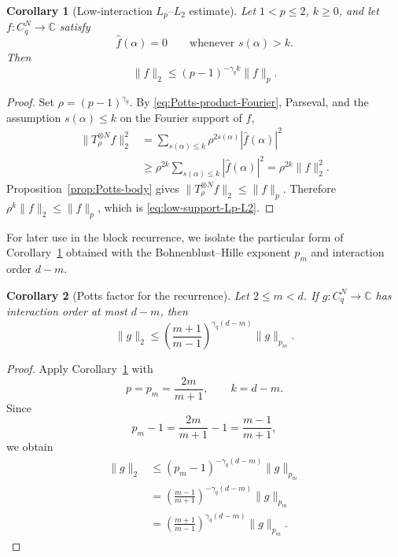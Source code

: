 \documentclass[11pt,a4paper]{article}
\numberwithin{equation}{section}
\theoremstyle{cleanplain}
\newtheorem{corollary}[corollary]{Corollary}
\theoremstyle{cleandefinition}
\theoremstyle{cleanremark}
\newcommand{\C}{\mathbb C}
\begin{document}
{\color{black}
\begin{corollary}[Low-interaction $L_p$--$L_2$ estimate]\label{cor:low-support-Lp-L2}
Let $1<p\leq2$, $k\geq0$, and let $f:C_q^N\to\C$ satisfy
\[
 \widehat f(\alpha)=0\qquad\text{whenever }s(\alpha)>k.
\]
Then
\begin{equation}\label{eq:low-support-Lp-L2}
 \|f\|_2\leq(p-1)^{-\gamma_q k}\|f\|_p.
\end{equation}
\end{corollary}

\begin{proof}
Set $\rho=(p-1)^{\gamma_q}$.  By \eqref{eq:Potts-product-Fourier}, Parseval,
and the assumption $s(\alpha)\leq k$ on the Fourier support of $f$,
\begin{align*}
 \|T_\rho^{\otimes N}f\|_2^2
 &=\sum_{s(\alpha)\leq k}
   \rho^{2s(\alpha)}|\widehat f(\alpha)|^2\\
 &\geq \rho^{2k}
   \sum_{s(\alpha)\leq k}|\widehat f(\alpha)|^2
 =\rho^{2k}\|f\|_2^2.
\end{align*}
Proposition~\ref{prop:Potts-body} gives
$\|T_\rho^{\otimes N}f\|_2\leq\|f\|_p$.  Therefore
$\rho^k\|f\|_2\leq\|f\|_p$, which is \eqref{eq:low-support-Lp-L2}.
\end{proof}
}

{\color{black}For later use in the block recurrence, we isolate the particular form of Corollary~\ref{cor:low-support-Lp-L2} obtained with the Bohnenblust--Hille exponent $p_m$ and interaction order $d-m$.}

{\color{black}
\begin{corollary}[Potts factor for the recurrence]\label{cor:Potts-factor-body}
Let $2\leq m<d$. If $g:C_q^N\to\C$ has interaction order at most $d-m$, then
\begin{equation}\label{eq:Potts-factor-body}
 \|g\|_2
 \leq
 \left(\frac{m+1}{m-1}\right)^{\gamma_q(d-m)}
 \|g\|_{p_m}.
\end{equation}
\end{corollary}

\begin{proof}
Apply Corollary~\ref{cor:low-support-Lp-L2} with
\[
 p=p_m=\frac{2m}{m+1},\qquad k=d-m.
\]
Since
\[
 p_m-1
 =\frac{2m}{m+1}-1
 =\frac{m-1}{m+1},
\]
we obtain
\begin{align*}
 \|g\|_2
 &\leq (p_m-1)^{-\gamma_q(d-m)}\|g\|_{p_m}\\
 &=\left(\frac{m-1}{m+1}\right)^{-\gamma_q(d-m)}\|g\|_{p_m}\\
 &=\left(\frac{m+1}{m-1}\right)^{\gamma_q(d-m)}\|g\|_{p_m}.
\end{align*}
\end{proof}}
\end{document}
